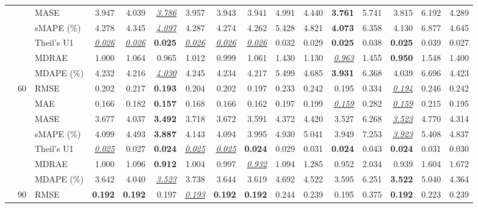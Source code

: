 \begin{table}[!htbp]
{\begin{tabular}{lllrrrrrrrrrrrrr}
 &  & MASE & 3.947 & 4.039 & \underline{\textit{3.786}} & 3.957 & 3.943 & 3.941 & 4.991 & 4.440 & \textbf{3.761} & 5.741 & 3.815 & 6.192 & 4.289 \\
 &  & sMAPE (\%) & 4.278 & 4.345 & \underline{\textit{4.097}} & 4.287 & 4.274 & 4.262 & 5.428 & 4.821 & \textbf{4.073} & 6.358 & 4.130 & 6.877 & 4.645 \\
 &  & Theil's U1 & \underline{\textit{0.026}} & \underline{\textit{0.026}} & \textbf{0.025} & \underline{\textit{0.026}} & \underline{\textit{0.026}} & \underline{\textit{0.026}} & 0.032 & 0.029 & \textbf{0.025} & 0.038 & \textbf{0.025} & 0.039 & 0.027 \\
 &  & MDRAE & 1.000 & 1.064 & 0.965 & 1.012 & 0.999 & 1.061 & 1.430 & 1.130 & \underline{\textit{0.963}} & 1.455 & \textbf{0.950} & 1.548 & 1.400 \\
 &  & MDAPE (\%) & 4.232 & 4.216 & \underline{\textit{4.030}} & 4.245 & 4.234 & 4.217 & 5.499 & 4.685 & \textbf{3.931} & 6.368 & 4.039 & 6.696 & 4.423 \\
\cmidrule(lr){2-16}
 & 60 & RMSE & 0.202 & 0.217 & \textbf{0.193} & 0.204 & 0.202 & 0.197 & 0.233 & 0.242 & 0.195 & 0.334 & \underline{\textit{0.194}} & 0.246 & 0.242 \\
 &  & MAE & 0.166 & 0.182 & \textbf{0.157} & 0.168 & 0.166 & 0.162 & 0.197 & 0.199 & \underline{\textit{0.159}} & 0.282 & \underline{\textit{0.159}} & 0.215 & 0.195 \\
 &  & MASE & 3.677 & 4.037 & \textbf{3.492} & 3.718 & 3.672 & 3.591 & 4.372 & 4.420 & 3.527 & 6.268 & \underline{\textit{3.523}} & 4.770 & 4.314 \\
 &  & sMAPE (\%) & 4.099 & 4.493 & \textbf{3.887} & 4.143 & 4.094 & 3.995 & 4.930 & 5.041 & 3.949 & 7.253 & \underline{\textit{3.923}} & 5.408 & 4.837 \\
 &  & Theil's U1 & \underline{\textit{0.025}} & 0.027 & \textbf{0.024} & \underline{\textit{0.025}} & \underline{\textit{0.025}} & \textbf{0.024} & 0.029 & 0.031 & \textbf{0.024} & 0.043 & \textbf{0.024} & 0.031 & 0.030 \\
 &  & MDRAE & 1.000 & 1.096 & \textbf{0.912} & 1.004 & 0.997 & \underline{\textit{0.932}} & 1.094 & 1.285 & 0.952 & 2.034 & 0.939 & 1.604 & 1.672 \\
 &  & MDAPE (\%) & 3.642 & 4.040 & \underline{\textit{3.523}} & 3.738 & 3.644 & 3.619 & 4.692 & 4.522 & 3.595 & 6.251 & \textbf{3.522} & 5.040 & 4.364 \\
\cmidrule(lr){2-16}
 & 90 & RMSE & \textbf{0.192} & \textbf{0.192} & 0.197 & \underline{\textit{0.193}} & \textbf{0.192} & \textbf{0.192} & 0.244 & 0.239 & 0.195 & 0.375 & \textbf{0.192} & 0.223 & 0.239 \\

\end{tabular}}
\end{table}
